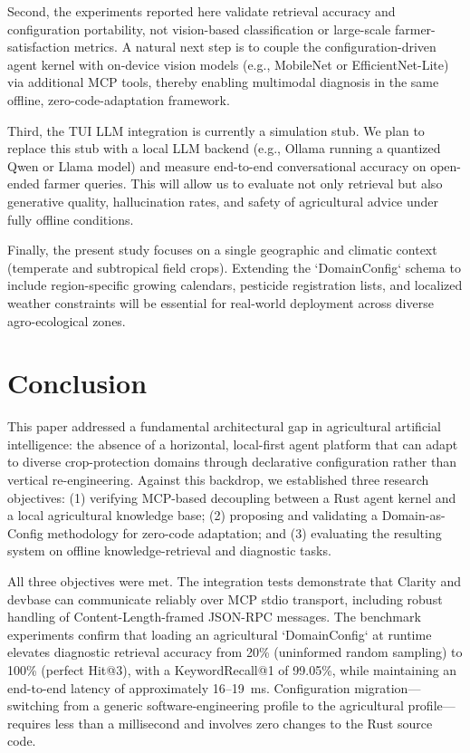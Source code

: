 \documentclass[11pt,a4paper]{article}
\begin{document}
Second, the experiments reported here validate retrieval accuracy and configuration portability, not vision-based classification or large-scale farmer-satisfaction metrics. A natural next step is to couple the configuration-driven agent kernel with on-device vision models (e.g., MobileNet or EfficientNet-Lite) via additional MCP tools, thereby enabling multimodal diagnosis in the same offline, zero-code-adaptation framework.

Third, the TUI LLM integration is currently a simulation stub. We plan to replace this stub with a local LLM backend (e.g., Ollama running a quantized Qwen or Llama model) and measure end-to-end conversational accuracy on open-ended farmer queries. This will allow us to evaluate not only retrieval but also generative quality, hallucination rates, and safety of agricultural advice under fully offline conditions.

Finally, the present study focuses on a single geographic and climatic context (temperate and subtropical field crops). Extending the `DomainConfig` schema to include region-specific growing calendars, pesticide registration lists, and localized weather constraints will be essential for real-world deployment across diverse agro-ecological zones.

\section{Conclusion}
\label{sec:conclusion}

This paper addressed a fundamental architectural gap in agricultural artificial intelligence: the absence of a horizontal, local-first agent platform that can adapt to diverse crop-protection domains through declarative configuration rather than vertical re-engineering. Against this backdrop, we established three research objectives: (1) verifying MCP-based decoupling between a Rust agent kernel and a local agricultural knowledge base; (2) proposing and validating a Domain-as-Config methodology for zero-code adaptation; and (3) evaluating the resulting system on offline knowledge-retrieval and diagnostic tasks.

All three objectives were met. The integration tests demonstrate that Clarity and devbase can communicate reliably over MCP stdio transport, including robust handling of Content-Length-framed JSON-RPC messages. The benchmark experiments confirm that loading an agricultural `DomainConfig` at runtime elevates diagnostic retrieval accuracy from 20\% (uninformed random sampling) to 100\% (perfect Hit@3), with a KeywordRecall@1 of 99.05\%, while maintaining an end-to-end latency of approximately 16--19~ms. Configuration migration---switching from a generic software-engineering profile to the agricultural profile---requires less than a millisecond and involves zero changes to the Rust source code.
\end{document}
